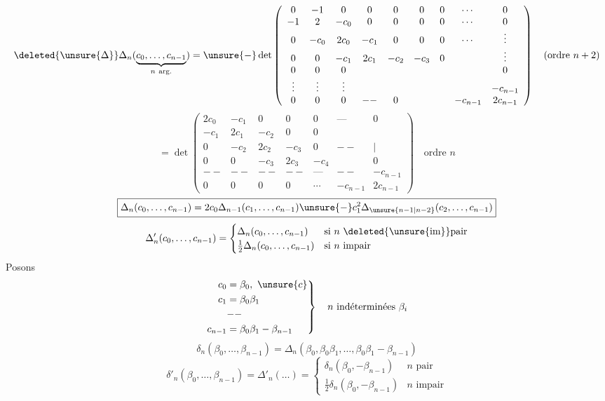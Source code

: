 \[
\deleted{\unsure{\Delta}}
\Delta_n(\underbrace{c_0,\ldots,c_{n-1}}_{n\ \text{arg.}})
=\unsure{-}\det\left(
\begin{array}{ccccccccc}
0&-1&0&0&0&0&0&\cdots&0\\
-1&2&-c_0&0&0&0&0&\cdots&0\\
0&-c_0&2c_0&-c_1&0&0&0&\cdots&\vdots\\
0&0&-c_1&2c_1&-c_2&-c_3&0&&\vdots\\
0&0&0&&&&&&0\\
\vdots&\vdots&\vdots&&&&&&-c_{n-1}\\
0&0&0&--&0&&&-c_{n-1}&2c_{n-1}
\end{array}\right)
\quad(\text{ordre }n+2)
\]
\[
=\det\left(
\begin{array}{ccccccc}
2c_0&-c_1&0&0&0&\text{---}&0\\
-c_1&2c_1&-c_2&0&0&&\\
0&-c_2&2c_2&-c_3&0&--&\big|\\
0&0&-c_3&2c_3&-c_4&&0\\
--&--&--&--&\text{---}&--&-c_{n-1}\\
0&0&0&0&\cdots&-c_{n-1}&2c_{n-1}
\end{array}\right)
\quad\text{ordre }n
\]
\[
\boxed{\Delta_n(c_0,\ldots,c_{n-1})
=2c_0\Delta_{n-1}(c_1,\ldots,c_{n-1})
\unsure{-}c_1^2\Delta_{\unsure{n-1|n-2}}(c_2,\ldots,c_{n-1})}
\]
\[
\Delta'_n(c_0,\ldots,c_{n-1})=
\begin{cases}
\Delta_n(c_0,\ldots,c_{n-1})&\text{si }n\ \deleted{\unsure{\text{im}}}\text{pair}\\
\frac12\Delta_n(c_0,\ldots,c_{n-1})&\text{si }n\text{ impair}
\end{cases}
\]
Posons
\[
\left.\begin{aligned}
c_0&=\beta_0,\ \unsure{c}\\
c_1&=\beta_0\beta_1\\
&\mathbin{--}\\
c_{n-1}&=\beta_0\beta_1\mathbin{-}\beta_{n-1}
\end{aligned}\right\}
\quad n\ \text{indéterminées }\beta_i
\]
\[
\delta_n(\beta_0,\ldots,\beta_{n-1})
=\Delta_n(\beta_0,\beta_0\beta_1,\ldots,\beta_0\beta_1\mathbin{-}\beta_{n-1})
\]
\[
\delta'_n(\beta_0,\ldots,\beta_{n-1})=\Delta'_n(\ldots)
=\begin{cases}
\delta_n(\beta_0,\mathbin{-}\beta_{n-1})&n\text{ pair}\\
\frac12\delta_n(\beta_0,\mathbin{-}\beta_{n-1})&n\text{ impair}
\end{cases}
\]
